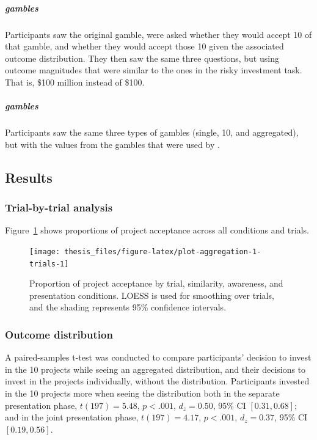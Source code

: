 \documentclass[a4paper, nobind, dvipsnames]{templates/ociamthesis}
\theoremstyle{definition}
\theoremstyle{definition}
\theoremstyle{definition}
\theoremstyle{definition}
\theoremstyle{remark}
\begin{document}
\subparagraph{\texorpdfstring{\textcite{samuelson1963} gambles}{Samuelson (1963) gambles}}

Participants saw the original \textcite{samuelson1963} gamble, were asked whether they
would accept 10 of that gamble, and whether they would accept those 10 given the
associated outcome distribution. They then saw the same three questions, but
using outcome magnitudes that were similar to the ones in the risky investment
task. That is, \$100 million instead of \$100.

\subparagraph{\texorpdfstring{\textcite{redelmeier1992} gambles}{Redelmeier \& Tversky (1992) gambles}}

Participants saw the same three types of gambles (single, 10, and aggregated),
but with the values from the gambles that were used by \textcite{redelmeier1992}.

\hypertarget{results-aggregation-1-appendix}{%
\subsection{Results}\label{results-aggregation-1-appendix}}

\hypertarget{trial-by-trial-aggregation-1}{%
\subsubsection{Trial-by-trial analysis}\label{trial-by-trial-aggregation-1}}

Figure~\ref{fig:plot-aggregation-1-trials} shows proportions of project
acceptance across all conditions and trials.



\begin{figure}
\texttt{[image: thesis\_files/figure-latex/plot-aggregation-1-trials-1]} \caption{Proportion of project acceptance by trial, similarity, awareness, and presentation conditions. LOESS is used for smoothing over trials, and the shading represents 95\% confidence intervals.}\label{fig:plot-aggregation-1-trials}
\end{figure}

\hypertarget{outcome-distribution-aggregation-1}{%
\subsubsection{Outcome distribution}\label{outcome-distribution-aggregation-1}}

A paired-samples t-test was conducted to compare participants' decision to
invest in the 10 projects while seeing an aggregated distribution, and their
decisions to invest in the projects individually, without the distribution.
Participants invested in the 10 projects more when seeing the distribution both
in the separate presentation phase,
\(t(197) = 5.48\), \(p < .001\), \(d_z = 0.50\), 95\% CI \([0.31, 0.68]\); and in the joint
presentation phase, \(t(197) = 4.17\), \(p < .001\), \(d_z = 0.37\), 95\% CI \([0.19, 0.56]\).
\end{document}
